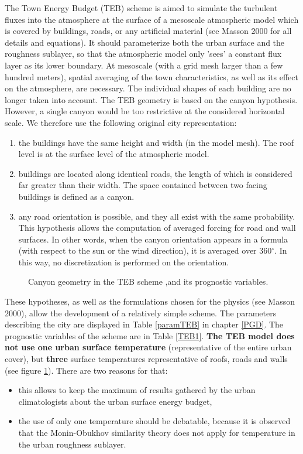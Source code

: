 The Town Energy Budget (TEB) scheme is aimed
to simulate the turbulent fluxes into the atmosphere
at the surface of a mesoscale atmospheric model which is covered
by buildings, roads, or any artificial material
(see Masson 2000 for all details and equations).
It should parameterize both the urban surface and the roughness sublayer,
so that the atmospheric model only 'sees' a constant flux layer
as its lower boundary.
At mesoscale (with a grid mesh larger than a few hundred meters), spatial
averaging of the town characteristics, as well as its effect on the atmosphere,
are necessary.
The individual shapes
of each building are no longer taken into account.
The TEB geometry is based on the canyon hypothesis. However, a
single canyon would be too restrictive at the
considered horizontal scale.
We therefore use the following original city representation:
\begin{enumerate}
\item the buildings have the same height and width (in the model mesh).
The roof level is at the surface level of the atmospheric model.
\item buildings are located along identical roads, the length
of which is considered
far greater than their width. The space contained between two facing buildings
is defined as a canyon.
\item any road orientation is possible, and they all exist
with the same probability. This hypothesis allows the computation
of averaged forcing
for road and wall surfaces. In other words, when the canyon orientation
appears in a formula (with respect to the sun or the wind direction),
it is averaged over 360$^\circ$. In this way, no discretization is performed
on the orientation.
\end{enumerate}

\begin{figure}[h]
\hspace*{2.cm}
\caption{Canyon geometry in the TEB scheme ,and its prognostic variables.
\label{TEB2}}
\end{figure}

These hypotheses, as well as the
formulations chosen for the physics (see Masson 2000), allow
the development of a relatively
simple scheme. The parameters describing the city
are displayed in Table \ref{paramTEB} in chapter \ref{PGD}.
The prognostic variables of the scheme are in Table \ref{TEB1}.
{\bf The TEB model
does not use one urban surface temperature} (representative of the
entire urban cover), but {\bf three} surface temperatures
representative of roofs, roads and walls (see figure \ref{TEB2}).
There are two reasons for that:
\begin{itemize}
\item this allows to keep the maximum of results gathered by the
urban climatologists about the urban surface energy budget,
\item the use of only one temperature should be debatable, because
it is observed that the Monin-Obukhov similarity theory does not
apply for temperature in the urban roughness sublayer.
\end{itemize}


